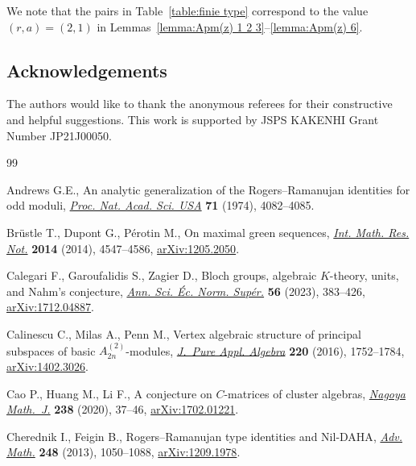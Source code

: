 \documentclass[10pt,a4paper]{amsart}
\numberwithin{equation}{section}
\theoremstyle{definition}
\begin{document}
We note that the pairs in Table~\ref{table:finie type} correspond to the
value $(r, a) = (2, 1)$ in Lemmas~\ref{lemma:Apm(z) 1 2 3}--\ref{lemma:Apm(z) 6}.

\subsection*{Acknowledgements}
 The authors would like to thank the anonymous referees for their constructive and helpful suggestions.
	This work is supported by JSPS KAKENHI Grant Number JP21J00050.


\begin{thebibliography}{99}
\footnotesize\itemsep=0pt

Andrews G.E., An analytic generalization of the {R}ogers--{R}amanujan
 identities for odd moduli,
 \href{https://doi.org/10.1073/pnas.71.10.4082}{\textit{Proc. Nat. Acad. Sci.
 USA}} \textbf{71} (1974), 4082--4085.

Br\"ustle T., Dupont G., P\'erotin M., On maximal green sequences,
 \href{https://doi.org/10.1093/imrn/rnt075}{\textit{Int. Math. Res. Not.}}
 \textbf{2014} (2014), 4547--4586,
 \href{http://arxiv.org/abs/1205.2050}{arXiv:1205.2050}.

Calegari F., Garoufalidis S., Zagier D., Bloch groups, algebraic {$K$}-theory,
 units, and {N}ahm's conjecture,
 \href{https://doi.org/10.24033/asens.2537}{\textit{Ann. Sci. \'Ec. Norm.
 Sup\'er.}} \textbf{56} (2023), 383--426,
 \href{http://arxiv.org/abs/1712.04887}{arXiv:1712.04887}.

Calinescu C., Milas A., Penn M., Vertex algebraic structure of principal
 subspaces of basic {$A_{2n}^{(2)}$}-modules,
 \href{https://doi.org/10.1016/j.jpaa.2015.10.001}{\textit{J.~Pure Appl.
 Algebra}} \textbf{220} (2016), 1752--1784,
 \href{http://arxiv.org/abs/1402.3026}{arXiv:1402.3026}.

Cao P., Huang M., Li F., A conjecture on {$C$}-matrices of cluster algebras,
 \href{https://doi.org/10.1017/nmj.2018.18}{\textit{Nagoya Math.~J.}}
 \textbf{238} (2020), 37--46,
 \href{http://arxiv.org/abs/1702.01221}{arXiv:1702.01221}.

Cherednik I., Feigin B., Rogers--{R}amanujan type identities and {N}il-{DAHA},
 \href{https://doi.org/10.1016/j.aim.2013.08.025}{\textit{Adv. Math.}}
 \textbf{248} (2013), 1050--1088,
 \href{http://arxiv.org/abs/1209.1978}{arXiv:1209.1978}.


\end{thebibliography}
\end{document}
